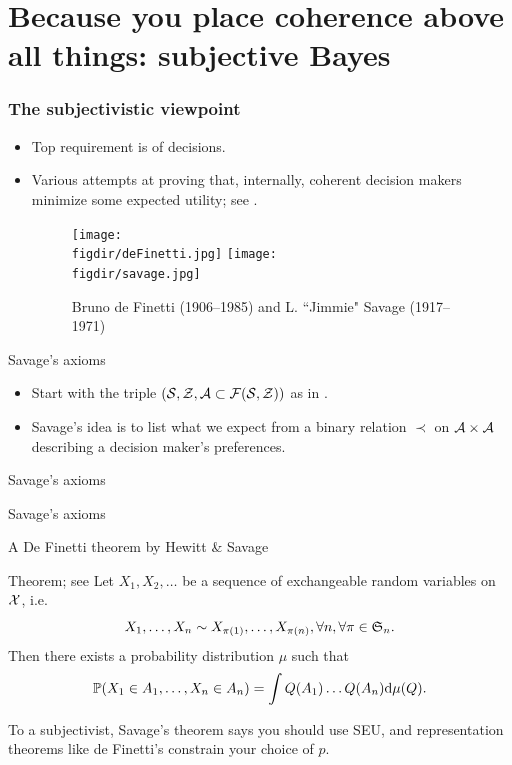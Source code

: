 \documentclass[10pt]{beamer}
\begin{document}
\section{Because you place coherence above all things: subjective Bayes}
\begin{frame}
  \frametitle{The subjectivistic viewpoint}
  \begin{itemize}
    \item Top requirement is  of decisions.
    \item Various attempts at proving that, internally, coherent decision makers minimize some expected utility; see \citep{PaIn09}.
    \begin{figure}
      \centering
      \texttt{[image: \\figdir/deFinetti.jpg]}
      \texttt{[image: \\figdir/savage.jpg]}
      \caption{Bruno de Finetti (1906--1985) and L. ``Jimmie" Savage (1917--1971)}
    \end{figure}
  \end{itemize}
\end{frame}

\begin{frame}{Savage's axioms}
\begin{itemize}
\item Start with the triple $(\mathcal{S},\mathcal{Z},\mathcal{A}\subset \mathcal{F}(\mathcal{S}, \mathcal{Z}))$ as in \cite{Wal50}.
\item Savage's idea is to list what we expect from a binary relation $\prec$ on $\mathcal{A}\times \mathcal{A}$ describing a decision maker's preferences.
\end{itemize}
\blank
\blank
\end{frame}

\begin{frame}{Savage's axioms}
\end{frame}

\begin{frame}{Savage's axioms}
\end{frame}

\begin{frame}{A De Finetti theorem by Hewitt \& Savage}
  \begin{block}{Theorem; see \citep[Theorem 1.49]{Sch12}}
    Let $X_1,X_2,\dots$ be a sequence of exchangeable random variables on $\mathcal{X}$, i.e.
    $$
    X_1,\dots,X_n \sim X_{\pi(1)},\dots, X_{\pi(n)}, \forall n, \forall \pi\in\frak S_n.
    $$
    Then there exists a probability distribution $\mu$  such that
    $$
    \mathbb P (X_1\in A_1, \dots, X_n\in A_n) = \int Q(A_1)\dots Q(A_n){\rm d}\mu(Q).
    $$
  \end{block}
  \vfill
  To a subjectivist, Savage's theorem says you should use SEU, and representation theorems like de Finetti's constrain your choice of $p$.
\end{frame}
\end{document}
